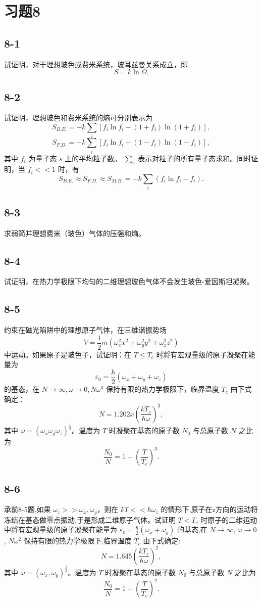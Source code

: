 \section{习题8}

\newpage
\subsection{8-1}
试证明，对于理想玻色或费米系统，玻耳兹曼关系成立，即
$$ S = k \ln \Omega. $$

\newpage
\subsection{8-2}
试证明，理想玻色和费米系统的熵可分别表示为
$$ S_{B.E.} = -k \sum_{i} [f_i \ln f_i - (1+f_i) \ln (1+f_i)], $$
$$ S_{F.D.} = -k \sum_{i} [f_i \ln f_i + (1-f_i) \ln (1-f_i)], $$
其中 $f_i$ 为量子态 $s$ 上的平均粒子数。 $\sum_{i}$ 表示对粒子的所有量子态求和。同时证明，当 $f_i << 1$ 时，有
$$ S_{B.E.} \approx S_{F.D.} \approx S_{M.B.} = -k \sum_{i} (f_i \ln f_i - f_i). $$

\newpage
\subsection{8-3}
求弱简并理想费米（玻色）气体的压强和熵。

\newpage
\subsection{8-4}
试证明，在热力学极限下均匀的二维理想玻色气体不会发生玻色-爱因斯坦凝聚。

\newpage
\subsection{8-5}
约束在磁光陷阱中的理想原子气体，在三维谐振势场
$$ V = \frac{1}{2} m(\omega_x^2 x^2 + \omega_y^2 y^2 + \omega_z^2 z^2) $$
中运动。如果原子是玻色子，试证明：在 $T \leq T_c$ 时将有宏观量级的原子凝聚在能量为
$$ \varepsilon_0 = \frac{\hbar}{2}(\omega_x + \omega_y + \omega_z) $$
的基态，在 $N \to \infty, \omega \to 0, N\omega^3$ 保持有限的热力学极限下，临界温度 $T_c$ 由下式确定：
$$ N = 1.202x\left(\frac{kT_c}{\hbar \omega}\right)^3, $$
其中 $\omega = (\omega_x \omega_y \omega_z)^{\frac{1}{3}}$。温度为 $T$ 时凝聚在基态的原子数 $N_0$ 与总原子数 $N$ 之比为
$$ \frac{N_0}{N} = 1 - \left(\frac{T}{T_c}\right)^3. $$

\newpage
\subsection{8-6}
承前8-5题,如果 $\omega_z >> \omega_x, \omega_y$，则在 $kT << \hbar \omega_z$ 的情形下,原子在z方向的运动将冻结在基态做零点振动,于是形成二维原子气体。试证明 $T < T_c$ 时原子的二维运动中将有宏观量级的原子凝聚在能量为 $\varepsilon_0 = \frac{\hbar}{2} (\omega_x + \omega_y)$ 的基态,在 $N \to \infty$, $\omega \to 0$, $N\omega^2$ 保持有限的热力学极限下,临界温度 $T_c$ 由下式确定:
$$ N = 1.645 \left( \frac{kT_c}{\hbar \omega} \right)^2, $$
其中 $\omega = (\omega_x, \omega_y)^{\frac{1}{2}}$。温度为 $T$ 时凝聚在基态的原子数 $N_0$ 与总原子数 $N$ 之比为
$$ \frac{N_0}{N} = 1 - \left( \frac{T}{T_c} \right)^2. $$

